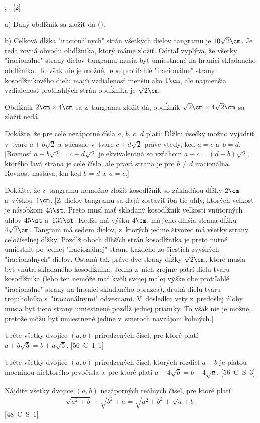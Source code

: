 {%
\fontplace
{}; ;
[2] \hfil\Obr

a) Daný obdĺžnik sa zložiť dá (\obr).
\inspicture{}

b) Celková dĺžka "iracionálnych" strán všetkých dielov tangramu je $10\sqrt2\cm$.
Je teda rovná obvodu obdĺžnika, ktorý máme zložiť. Odtiaľ vyplýva, že všetky "iracionálne" strany dielov tangramu musia byť
umiestnené na hranici skladaného obdĺžnika.
To však nie je možné, lebo protiľahlé
"iracionálne" strany kosodĺžnikového dielu majú vzdialenosť menšiu ako $1\cm$,
ale najmenšia vzdialenosť protiľahlých strán obdĺžnika je $\sqrt2\cm$.

\zaver
Obdĺžnik $2\cm\times4\cm$ sa z~tangramu zložiť dá, obdĺžnik $\sqrt2\cm\times4\sqrt2\cm$ sa zložiť nedá.


Dokážte, že pre celé nezáporné čísla $a$, $b$, $c$, $d$ platí:
Dĺžku úsečky možno vyjadriť v~tvare $a+b\sqrt2$ a~súčasne v~tvare $c+d\sqrt2$
práve vtedy, keď $a=c$ a~$b=d$.
[Rovnosť $a+b\sqrt2=c+d\sqrt2$ je ekvivalentná so vzťahom $a-c=(d-b)\sqrt2$,
ktorého ľavá strana je celé číslo, ale pravá strana je pre $b\ne d$ iracionálna.
Rovnosť nastáva, len keď $b=d$ a~$a=c$.]

\D%
Dokážte, že z~tangramu nemožno zložiť kosodĺžnik so základňou dĺžky $2\cm$
a~výškou $4\cm$.
[Z~dielov tangramu sa dajú zostaviť iba tie uhly, ktorých veľkosť je násobkom
$45\st$. Preto musí mať skladaný kosodĺžnik veľkosti vnútorných uhlov $45\st$ a~$135\st$.
Keďže má výšku $4\cm$, má jeho dlhšia strana dĺžku $4\sqrt2\cm$.
Tangram má sedem dielov, z~ktorých jedine štvorec má všetky strany celočíselnej dĺžky.
Pozdĺž oboch dlhších strán kosodĺžnika je preto nutné umiestniť
po jednej "iracionálnej" strane každého zo šiestich zvyšných "iracionálnych" dielov.
Ostanú tak práve dve strany dĺžky $\sqrt2\cm$, ktoré musia byť vnútri
skladaného kosodĺžnika. Jedna z~nich
zrejme patrí dielu tvaru kosodĺžnika (lebo ten nemôže mať kvôli svojej malej výške
obe protiľahlé "iracionálne" strany na hranici skladaného obrazca), druhá
dielu tvaru trojuholníka s~"iracionálnymi" odvesnami. V~dôsledku vety z~predošlej
úlohy musia byť tieto strany umiestnené pozdĺž jednej priamky. To však nie je možné,
pretože môžu byť umiestnené jedine v~smeroch navzájom kolmých.]

Určte všetky dvojice $(a, b)$ prirodzených čísel, pre ktoré platí
$a+b\sqrt5=b+a\sqrt5$.
[56--C--I--1]

Určte všetky dvojice $(a, b)$ prirodzených čísel, ktorých rozdiel $a - b$
je piatou mocninou niektorého prvočísla a~pre ktoré platí $a-4\sqrt b=b+4\sqrt a$.
[56--C--S--3]

Nájdite všetky dvojice $(a, b)$ nezáporných reálnych čísel, pre ktoré platí
$$
\sqrt{a^2+b}+\sqrt{b^2+a}=
\sqrt{a^2+b^2}+\sqrt{a+b}.
$$
[48--C--S--1]
}

